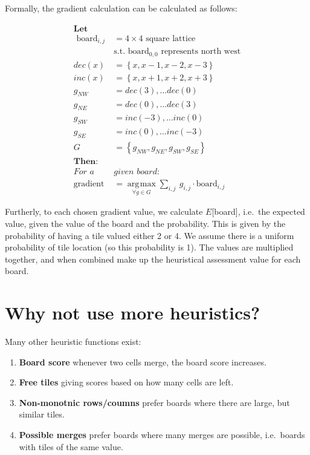 \documentclass[journal]{IEEEtran}
\DeclareMathOperator*{\argmax}{\arg\!\max}
\begin{document}
Formally, the gradient calculation can be calculated as follows:
\begin{framed}
\begin{align*}
    \textbf{Let} \\
    \text{\ board}_{i,j} &= 4\times{}4 \text{\ square lattice} \\
                            &\text{s.t. } \text{board}_{0,0} \text{\ represents north west} \\
    dec(x) &= \left\{x, x-1, x-2, x-3\right\} \\
    inc(x) &= \left\{x, x+1, x+2, x+3\right\} \\
    g_{NW} &= {dec(3), \dots dec(0)} \\
    g_{NE} &= {dec(0), \dots dec(3)} \\
    g_{SW} &= {inc(-3), \dots inc(0)} \\
    g_{SE} &= {inc(0), \dots inc(-3)} \\
    G &= \left\{g_{NW}, g_{NE}, g_{SW}, g_{SE}\right\} \\
    \textbf{Then:} \\
    \textit{For a } & \textit{given board:} \\
    \text{gradient } &= \argmax\limits_{\forall{}g \in G}\sum\limits_{i,j}{{\ g_{i,j} \cdot \text{board}_{i,j}}}
\end{align*}
\end{framed}

Furtherly, to each chosen gradient value, we calculate $E$[board], i.e.\ the
expected value, given the value of the board and the probability. This
is given by the probability of having a tile valued either 2 or 4. We assume
there is a uniform probability of tile location (so this probability is 1).
The values are multiplied together, and when combined make up 
the heuristical assessment value for each board.

\section*{Why not use more heuristics?}

Many other heuristic functions exist:
\begin{enumerate}
    \item\label{it:score} \textbf{Board score} \textendash{} whenever two cells merge, the board score increases.
    \item\label{it:free} \textbf{Free tiles} \textendash{} giving scores based on how many cells are left.
    \item\label{it:nonmono} \textbf{Non-monotnic rows/coumns} \textendash{} prefer boards where there are large, but similar
        tiles.
    \item\label{it:merges} \textbf{Possible merges} \textendash{} prefer boards where many merges are possible,
       i.e.\ boards with tiles of the same value.
\end{enumerate}
\end{document}
